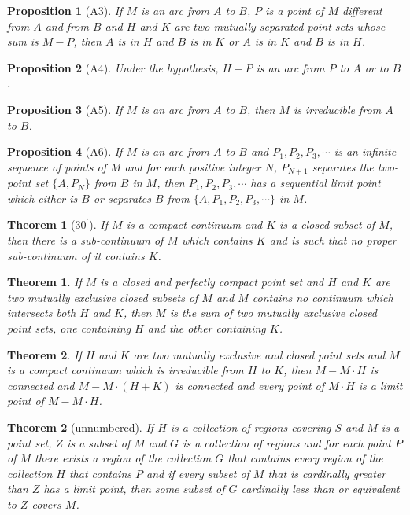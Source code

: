 \documentclass[10pt]{report}
\newtheorem{theorem}{Theorem}
\newtheorem*{theorem*}{Theorem}
\newtheorem*{proposition}{Proposition}
\begin{document}
\begin{proposition}[A3]
 If $M$ is an arc from $A$ to $B$, $P$ is a point of $M$ different from $A$ and from $B$ and $H$ and $K$ are two
mutually separated point sets whose sum is $M-P$, then $A$ is in $H$ and $B$ is in $K$ or $A$ is in $K$ and $B$ is in
$H$.
\end{proposition}

\begin{proposition}[A4]
 Under the hypothesis, $H+P$ is an arc from $P$ to $A$ or to $B$.
\end{proposition}

\begin{proposition}[A5]
 If $M$ is an arc from $A$ to $B$, then $M$ is irreducible from $A$ to $B$.
\end{proposition}

\begin{proposition}[A6]
 If $M$ is an arc from $A$ to $B$ and $P_1,P_2,P_3,\cdots$ is an infinite sequence of points of $M$ and for each
positive integer $N$, $P_{N+1}$ separates the two-point set $\{A,P_N\}$ from $B$ in $M$, then $P_1,P_2,P_3,\cdots$ has a
sequential limit point which either is $B$ or separates $B$ from $\{A,P_1,P_2,P_3,\cdots\}$ in $M$.
\end{proposition}

\begin{theorem*}[$30^\prime$]
 If $M$ is a compact continuum and $K$ is a closed subset of $M$, then there is a sub-continuum of $M$ which contains
$K$ and is such that no proper sub-continuum of it contains $K$.
\end{theorem*}

\begin{theorem}
 If $M$ is a closed and perfectly compact point set and $H$ and $K$ are two mutually exclusive closed subsets of $M$
and $M$ contains no continuum which intersects both $H$ and $K$, then $M$ is the sum of two mutually exclusive closed
point sets, one containing $H$ and the other containing $K$.
\end{theorem}

\begin{theorem}
 If $H$ and $K$ are two mutually exclusive and closed point sets and $M$ is a compact continuum which is irreducible
from $H$ to $K$, then $M-M\cdot H$ is connected and $M-M\cdot(H+K)$ is connected and every point of $M\cdot H$ is a
limit point of $M-M\cdot H$.
\end{theorem}

\begin{theorem*}[unnumbered]
 If $H$ is a collection of regions covering $S$ and $M$ is a point set, $Z$ is a subset of $M$ and $G$ is a collection
of regions and for each point $P$ of $M$ there exists a region of the collection $G$ that contains every region of the
collection $H$ that contains $P$ and if every subset of $M$ that is cardinally greater than $Z$ has a limit point, then
some subset of $G$ cardinally less than or equivalent to $Z$ covers $M$.
\end{theorem*}
\end{document}
